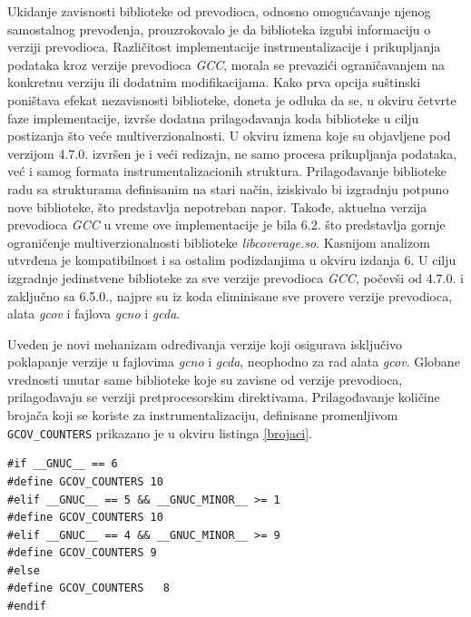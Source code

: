 \documentclass[12pt,oneside]{memoir}
\newcommand{\kod}[1]{\texttt{#1}}
\newcommand{\strano}[1]{\textit{#1}}
\begin{document}
Ukidanje zavisnosti biblioteke od prevodioca, odnosno omogućavanje njenog samostalnog prevođenja, prouzrokovalo je da biblioteka izgubi informaciju o verziji prevodioca. Različitost implementacije instrmentalizacije i prikupljanja podataka kroz verzije prevodioca \strano{GCC}, morala se prevazići ograničavanjem na konkretnu verziju ili dodatnim modifikacijama. Kako prva opcija suštinski poništava efekat nezavisnosti biblioteke, doneta je odluka da se, u okviru četvrte faze implementacije, izvrše dodatna prilagođavanja koda biblioteke u cilju postizanja što veće multiverzionalnosti. U okviru izmena koje su objavljene pod verzijom 4.7.0. izvršen je i veći redizajn, ne samo procesa prikupljanja podataka, već i samog formata instrumentalizacionih struktura. Prilagođavanje biblioteke radu sa strukturama definisanim na stari način, iziskivalo bi izgradnju potpuno nove biblioteke, što predstavlja nepotreban napor. Takođe, aktuelna verzija prevodioca \strano{GCC} u vreme ove implementacije je bila 6.2. što predstavlja gornje ograničenje multiverzionalnosti biblioteke \strano{libcoverage.so}. Kasnijom analizom utvrđena je kompatibilnost i sa ostalim podizdanjima u okviru izdanja 6. U cilju izgradnje jedinstvene biblioteke za sve verzije prevodioca \strano{GCC}, počevši od 4.7.0. i zaključno sa 6.5.0., najpre su iz koda eliminisane sve provere verzije prevodioca, alata \strano{gcov} i fajlova \strano{gcno} i \strano{gcda}. 

Uveden je novi mehanizam određivanja verzije koji osigurava isključivo poklapanje verzije u fajlovima \strano{gcno} i \strano{gcda}, neophodno za rad alata \strano{gcov}. 
Globane vrednosti unutar same biblioteke koje su zavisne od verzije prevodioca, prilagođavaju se verziji pretprocesorskim direktivama. Prilagođavanje količine brojača koji se koriste za instrumentalizaciju, definisane promenljivom \kod{GCOV\_COUNTERS} prikazano je u okviru listinga \ref{brojaci}.

\newpage

\begin{lstlisting}[caption={Definisanje količine brojača u zavisnosti od verzije prevodioca},frame=single, label=brojaci]
#if __GNUC__ == 6
#define GCOV_COUNTERS 10
#elif __GNUC__ == 5 && __GNUC_MINOR__ >= 1
#define GCOV_COUNTERS 10
#elif __GNUC__ == 4 && __GNUC_MINOR__ >= 9
#define GCOV_COUNTERS 9
#else
#define GCOV_COUNTERS   8
#endif
\end{lstlisting}
\end{document}
